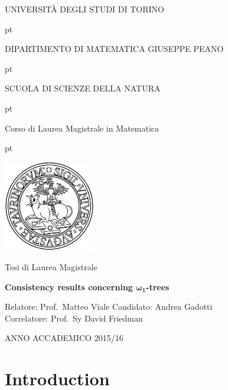 \documentclass[11pt,a4paper]{report}
\theoremstyle{definition}
\theoremstyle{num.custom-title}
\theoremstyle{custom-title}
\begin{document}
\thispagestyle{empty}

\centerline {\Large{\textsc{ UNIVERSIT\`A DEGLI STUDI DI TORINO}}}
 pt

\centerline {\Large{\textsc DIPARTIMENTO DI MATEMATICA GIUSEPPE PEANO}}

 pt

\centerline {{\textsc SCUOLA DI SCIENZE DELLA NATURA}}

 pt

\centerline {\Large{\textsc Corso di Laurea Magistrale in Matematica}}
 pt





\centerline {\includegraphics[width=4cm]{logo.png}}

\vskip 1.2cm

\centerline {\normalsize {Tesi di Laurea  Magistrale}} 

\vskip 0.7cm

\centerline {\Large {\bf Consistency results concerning $\bm{\omega_1}$-trees}}

\vskip 1.7cm

\noindent Relatore: Prof.\ Matteo Viale
\hfill  {Candidato: Andrea Gadotti}
\\
Correlatore: Prof.\ Sy David Friedman



\vskip 2.7cm


\centerline{ANNO ACCADEMICO 2015/16}



\newpage\null\thispagestyle{empty}\newpage

\setcounter{page}{1}



\tableofcontents

\chapter*{Introduction}
\end{document}
